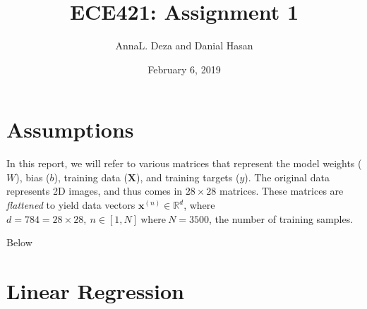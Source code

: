 \documentclass{article}
\title{ECE421: Assignment 1}
\author{AnnaL. Deza and Danial Hasan }
\date{February 6, 2019}
\newcommand{\R}{\mathbb{R}}
\begin{document}
\maketitle

\section*{Assumptions}
In this report, we will refer to various matrices that represent the model weights ($W$), bias ($b$), training data ($\mathbf{X}$), and training targets ($y$). The original data represents 2D images, and thus comes in $28\times28$ matrices. These matrices are \textit{flattened} to yield data vectors $\mathbf{x}^{(n)}\in \R^{d}$, where $d = 784 = 28\times28, \ n \in [1, N] \ \mathrm{where} \ N=3500$, the number of training samples. 

Below

\section{Linear Regression}
\end{document}
